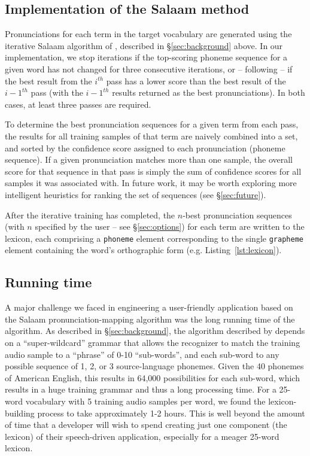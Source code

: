 \documentclass[11pt]{article}
\begin{document}
\subsection{Implementation of the Salaam method}
\label{sec:implementation}

Pronunciations for each term in the target vocabulary are generated using the iterative Salaam algorithm of , described in \S\ref{sec:background} above. In our implementation, 
we stop iterations
if the top-scoring phoneme sequence for a given word has not changed for three consecutive iterations, or -- following  --  if the best result from the $i^{th}$ pass has a lower score than the best result of the ${i - 1}^{th}$ pass (with the ${i - 1}^{th}$ results returned as the best pronunciations). In both cases, at least three passes are required. 

To determine the best pronunciation sequences for a given term from each pass, the results for all training samples of that term are naively combined into a set, and sorted by the confidence score assigned to each pronunciation (phoneme sequence). If a given pronunciation matches more than one sample, the overall score for that sequence in that pass is simply the sum of confidence scores for all samples it was associated with. In future work, it may be worth exploring more intelligent heuristics for ranking the set of sequences (see \S\ref{sec:future}).

After the iterative training has completed, the $n$-best pronunciation sequences (with $n$ specified by the user -- see \S\ref{sec:options}) for each term are written to the lexicon, each comprising a \texttt{phoneme} element corresponding to the single \texttt{grapheme} element containing the word's orthographic form (e.g. Listing~\ref{lst:lexicon}).

\subsection{Running time}
\label{sec:runningtime}

A major challenge we faced in engineering a user-friendly application based on the Salaam pronunciation-mapping algorithm \cite{Qiao10} was the long running time of the algorithm. As described in \S\ref{sec:background}, the algorithm described by  depends on a ``super-wildcard'' grammar that allows the recognizer to match the training audio sample to a ``phrase'' of 0-10 ``sub-words'', and each sub-word to any possible sequence of 1, 2, or 3 source-language phonemes. Given the 40 phonemes of American English, this results in 64,000 possibilities for each sub-word, which results in a huge training grammar and thus a long processing time. For a 25-word vocabulary with 5 training audio samples per word, we found the lexicon-building process to take approximately 1-2 hours. This is well beyond the amount of time that a developer will wish to spend creating just one component (the lexicon) of their speech-driven application, especially for a meager 25-word lexicon. 
\end{document}
